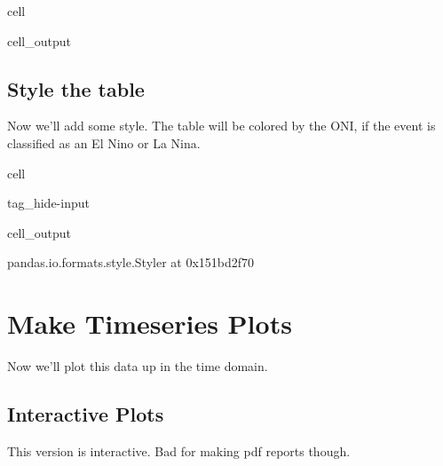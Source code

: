 \documentclass[letterpaper,10pt,english]{jupyterBook}
\begin{document}
\begin{sphinxuseclass}{cell}
\begin{sphinxVerbatimOutput}
\begin{sphinxuseclass}{cell_output}
\end{sphinxuseclass}\end{sphinxVerbatimOutput}

\end{sphinxuseclass}

\chapter{Style the table}
\label{\detokenize{notebooks/regional_and_local/SL_Rankings_annual:style-the-table}}\label{\detokenize{notebooks/regional_and_local/SL_Rankings_annual:sl-rankings-results}}
\sphinxAtStartPar
Now we’ll add some style. The table will be colored by the ONI, if the event is classified as an El Nino or La Nina.

\begin{sphinxuseclass}{cell}
\begin{sphinxuseclass}{tag_hide-input}\begin{sphinxVerbatimOutput}

\begin{sphinxuseclass}{cell_output}
\begin{sphinxVerbatim}[commandchars=\\\{\}]
\PYGZlt{}pandas.io.formats.style.Styler at 0x151bd2f70\PYGZgt{}
\end{sphinxVerbatim}

\end{sphinxuseclass}\end{sphinxVerbatimOutput}

\end{sphinxuseclass}
\end{sphinxuseclass}

\part{Make Timeseries Plots}
\label{\detokenize{notebooks/regional_and_local/SL_Rankings_annual:make-timeseries-plots}}\label{\detokenize{notebooks/regional_and_local/SL_Rankings_annual:sl-rankings-timeseries}}
\sphinxAtStartPar
Now we’ll plot this data up in the time domain.


\chapter{Interactive Plots}
\label{\detokenize{notebooks/regional_and_local/SL_Rankings_annual:interactive-plots}}
\sphinxAtStartPar
This version is interactive. Bad for making pdf reports though.
\end{document}
